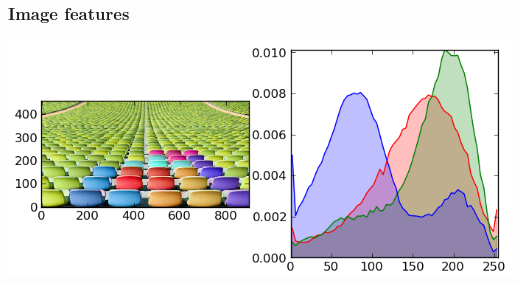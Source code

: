 \begin{frame}
  \frametitle{Image features}

  \begin{center}
  \includegraphics[width=\textwidth]{../../code/image_data/chairs_64.png}
  \end{center}

\end{frame}
